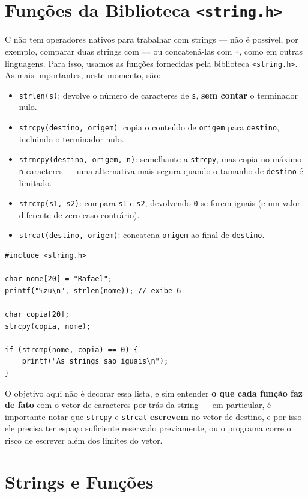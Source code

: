 \section{Funções da Biblioteca \texttt{<string.h>}}

C não tem operadores nativos para trabalhar com strings — não é possível, por exemplo, comparar duas strings com \texttt{==} ou concatená-las com \texttt{+}, como em outras linguagens. Para isso, usamos as funções fornecidas pela biblioteca \texttt{<string.h>}. As mais importantes, neste momento, são:

\begin{itemize}
    \item \texttt{strlen(s)}: devolve o número de caracteres de \texttt{s}, \textbf{sem contar} o terminador nulo.
    \item \texttt{strcpy(destino, origem)}: copia o conteúdo de \texttt{origem} para \texttt{destino}, incluindo o terminador nulo.
    \item \texttt{strncpy(destino, origem, n)}: semelhante a \texttt{strcpy}, mas copia no máximo \texttt{n} caracteres — uma alternativa mais segura quando o tamanho de \texttt{destino} é limitado.
    \item \texttt{strcmp(s1, s2)}: compara \texttt{s1} e \texttt{s2}, devolvendo \texttt{0} se forem iguais (e um valor diferente de zero caso contrário).
    \item \texttt{strcat(destino, origem)}: concatena \texttt{origem} ao final de \texttt{destino}.
\end{itemize}

\begin{lstlisting}
#include <string.h>

char nome[20] = "Rafael";
printf("%zu\n", strlen(nome)); // exibe 6

char copia[20];
strcpy(copia, nome);

if (strcmp(nome, copia) == 0) {
    printf("As strings sao iguais\n");
}
\end{lstlisting}

O objetivo aqui não é decorar essa lista, e sim entender \textbf{o que cada função faz de fato} com o vetor de caracteres por trás da string — em particular, é importante notar que \texttt{strcpy} e \texttt{strcat} \textbf{escrevem} no vetor de destino, e por isso ele precisa ter espaço suficiente reservado previamente, ou o programa corre o risco de escrever além dos limites do vetor.

\section{Strings e Funções}


